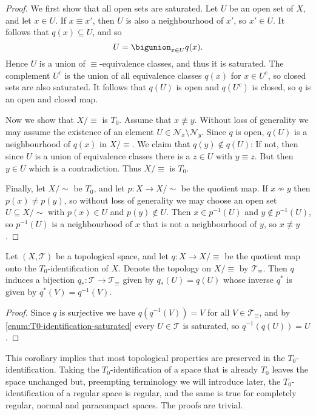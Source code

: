 \documentclass[article, a4paper, 11pt, oneside]{memoir}
\numberwithin{equation}{chapter}
\newcommand{\preim}{^{-1}}
\newcommand{\calN}{\mathcal{N}}
\newcommand{\nhoodfilter}[1]{\calN_{#1}}
\newcommand{\calT}{\mathcal{T}}
\begin{document}
\begin{proof}
    We first show that all open sets are saturated. Let $U$ be an open set of $X$, and let $x \in U$. If $x \equiv x'$, then $U$ is also a neighbourhood of $x'$, so $x' \in U$. It follows that $q(x) \subseteq U$, and so
    \begin{equation*}
        U = \bigunion_{x \in U} q(x).
    \end{equation*}
    Hence $U$ is a union of $\equiv$-equivalence classes, and thus it is saturated. The complement $U^c$ is the union of all equivalence classes $q(x)$ for $x \in U^c$, so closed sets are also saturated. It follows that $q(U)$ is open and $q(U^c)$ is closed, so $q$ is an open and closed map.

    Now we show that $X/{\equiv}$ is $T_0$. Assume that $x \not\equiv y$. Without loss of generality we may assume the existence of an element $U \in \nhoodfilter{x} \setminus \nhoodfilter{y}$. Since $q$ is open, $q(U)$ is a neighbourhood of $q(x)$ in $X/{\equiv}$. We claim that $q(y) \not\in q(U)$: If not, then since $U$ is a union of equivalence classes there is a $z \in U$ with $y \equiv z$. But then $y \in U$ which is a contradiction. Thus $X/{\equiv}$ is $T_0$.

    Finally, let $X/{\sim}$ be $T_0$, and let $p \colon X \to X/{\sim}$ be the quotient map. If $x \not\sim y$ then $p(x) \neq p(y)$, so without loss of generality we may choose an open set $U \subseteq X/{\sim}$ with $p(x) \in U$ and $p(y) \not\in U$. Then $x \in p\preim(U)$ and $y \not\in p\preim(U)$, so $p\preim(U)$ is a neighbourhood of $x$ that is not a neighbourhood of $y$, so $x \not\equiv y$.
\end{proof}


\begin{corollary}
    Let $(X,\calT)$ be a topological space, and let $q \colon X \to X/{\equiv}$ be the quotient map onto the $T_0$-identification of $X$. Denote the topology on $X/{\equiv}$ by $\calT_\equiv$. Then $q$ induces a bijection $q_* \colon \calT \to \calT_\equiv$ given by $q_*(U) = q(U)$ whose inverse $q^*$ is given by $q^*(V) = q\preim(V)$.
\end{corollary}

\begin{proof}
    Since $q$ is surjective we have $q(q\preim(V)) = V$ for all $V \in \calT_\equiv$, and by \cref{enum:T0-identification-saturated} every $U \in \calT$ is saturated, so $q\preim(q(U)) = U$.
\end{proof}
%
This corollary implies that most topological properties are preserved in the $T_0$-identification. Taking the $T_0$-identification of a space that is already $T_0$ leaves the space unchanged but, preempting terminology we will introduce later, the $T_0$-identification of a regular space is regular, and the same is true for completely regular, normal and paracompact spaces. The proofs are trivial.
\end{document}
